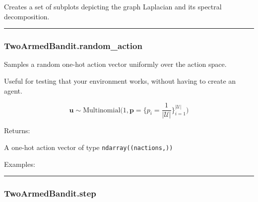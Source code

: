 Creates a set of subplots depicting the graph Laplacian and its spectral
decomposition.

\begin{center}\rule{0.5\linewidth}{\linethickness}\end{center}

\hypertarget{twoarmedbandit.random_action}{%
\subsubsection{TwoArmedBandit.random\_action}\label{twoarmedbandit.random_action}}

\begin{Shaded}
\begin{Highlighting}[]
\NormalTok{)}
\end{Highlighting}
\end{Shaded}

Samples a random one-hot action vector uniformly over the action space.

Useful for testing that your environment works, without having to create
an agent.

\[
\mathbf u \sim \mathrm{Multinomial}\Big(1, \mathbf p=\{p_i = \frac{1}{|\mathcal U|}\}_{i=1}^{|\mathcal U|}\Big)
\]

Returns:

A one-hot action vector of type \texttt{ndarray((nactions,))}

Examples:

\begin{Shaded}
\begin{Highlighting}[]
\OperatorTok{=}
\end{Highlighting}
\end{Shaded}

\begin{center}\rule{0.5\linewidth}{\linethickness}\end{center}

\hypertarget{twoarmedbandit.step}{%
\subsubsection{TwoArmedBandit.step}\label{twoarmedbandit.step}}

\begin{Shaded}
\begin{Highlighting}[]
\end{Highlighting}
\end{Shaded}

